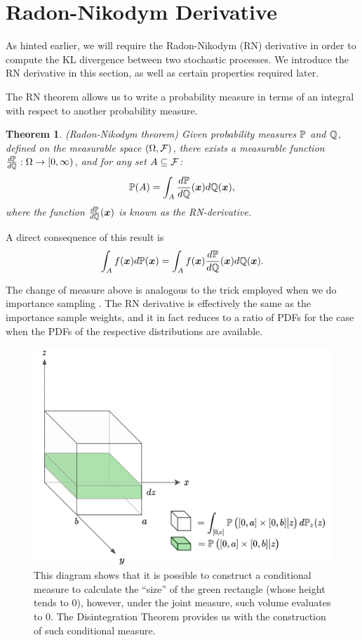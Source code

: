 \documentclass[a4paper,12pt,twoside,openright]{report}
\newtheorem{theorem}{Theorem}
\theoremstyle{definition}
\begin{document}
\section{Radon-Nikodym Derivative}

As hinted earlier, we will require the Radon-Nikodym (RN) derivative in order to compute the KL divergence between two stochastic processes. We introduce the RN derivative in this section, as well as certain properties required later.

The RN theorem allows us to write a probability measure in terms of an integral with respect to another probability measure. 

\begin{theorem}
(Radon-Nikodym theorem)
Given probability measures $\P$ and $\Q$, defined on the measurable space $(\Omega, \calF)$, there exists a measurable function $\frac{d\P}{d\Q}:\Omega \rightarrow [0, \infty)$, and for any  set $A \subseteq  \calF$:
\begin{align}
    \P(A) = \int_{A} \frac{d\P}{d\Q}(\vx) d\Q(\vx),
\end{align}
where the function $\frac{d\P}{d\Q}(\vx)$ is known as the RN-derivative.
\end{theorem}

A direct consequence of this result is
\begin{align*}
    \int_A f(\vx) d\P(\vx) =  \int_{A} f(\vx)  \frac{d\P}{d\Q}(\vx)  d\Q(\vx).
\end{align*}

The change of measure above is analogous to the trick employed when we do importance sampling \citep{martino2017effective}. The RN derivative is effectively the same as the importance sample weights, and it in fact reduces to a ratio of PDFs for the case when the PDFs of the respective distributions are available.
\begin{figure}[t!]
    \centering
    \includegraphics[scale=0.3]{images/disint2.png}
    \caption{ This diagram shows that it is possible to construct a conditional measure to calculate the ``size'' of the green rectangle (whose height tends to 0), however, under the joint measure, such volume evaluates to $0$. The Disintegration Theorem provides us with the construction of such conditional measure.}
    \label{fig:disintegration}
\end{figure}
\end{document}
